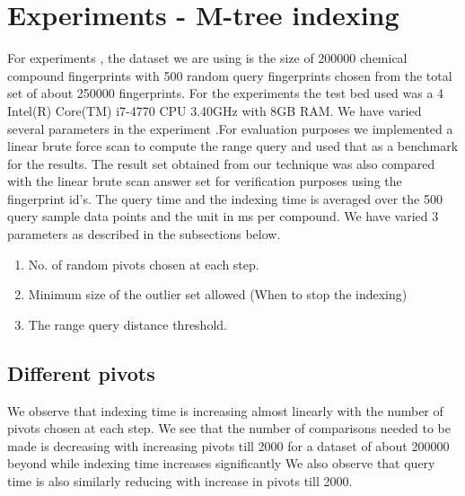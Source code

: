 
\section{Experiments - M-tree indexing}

For experiments , the dataset we are using is the size of 200000 chemical compound fingerprints with 500 random query fingerprints chosen from the total set of about 250000 fingerprints. For the experiments the test bed used was a 4 Intel(R) Core(TM) i7-4770 CPU \@ 3.40GHz with 8GB RAM. We have varied several parameters in the experiment .For evaluation purposes we implemented a linear brute force scan to compute the range query and used that as a benchmark for the results. The result set obtained from our technique was also compared with the linear brute scan answer set for verification purposes using the fingerprint id's. The query time and the indexing time is averaged over the 500 query sample data points and the unit in ms per compound. We have varied 3 parameters as described in the subsections below.

\begin{enumerate}

	\item No. of random pivots chosen at each step.

	\item Minimum size of the outlier set allowed (When to stop the indexing)

	\item The range query distance threshold.	\\
\end{enumerate}

\subsection{Different pivots}

We observe that indexing time is increasing almost linearly with the number of pivots chosen at each step. We see that the number of comparisons needed to be made is decreasing with increasing pivots till 2000 for a dataset of about 200000 beyond while indexing time increases significantly We also observe that query time is also similarly reducing with increase in pivots till 2000.

